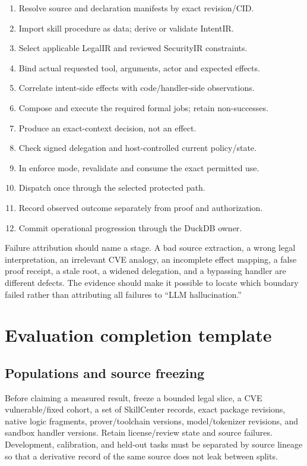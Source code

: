 \documentclass{article}
\begin{document}
\begin{enumerate}
\item Resolve source and declaration manifests by exact revision/CID.
\item Import skill procedure as data; derive or validate IntentIR.
\item Select applicable LegalIR and reviewed SecurityIR constraints.
\item Bind actual requested tool, arguments, actor and expected effects.
\item Correlate intent-side effects with code/handler-side observations.
\item Compose and execute the required formal jobs; retain non-successes.
\item Produce an exact-context decision, not an effect.
\item Check signed delegation and host-controlled current policy/state.
\item In enforce mode, revalidate and consume the exact permitted use.
\item Dispatch once through the selected protected path.
\item Record observed outcome separately from proof and authorization.
\item Commit operational progression through the DuckDB owner.
\end{enumerate}

Failure attribution should name a stage. A bad source extraction, a wrong legal interpretation, an irrelevant CVE analogy, an incomplete effect mapping, a false proof receipt, a stale root, a widened delegation, and a bypassing handler are different defects. The evidence should make it possible to locate which boundary failed rather than attributing all failures to ``LLM hallucination.''

\section{Evaluation completion template}

\subsection{Populations and source freezing}

Before claiming a measured result, freeze a bounded legal slice, a CVE vulnerable/fixed cohort, a set of SkillCenter records, exact package revisions, native logic fragments, prover/toolchain versions, model/tokenizer revisions, and sandbox handler versions. Retain license/review state and source failures. Development, calibration, and held-out tasks must be separated by source lineage so that a derivative record of the same source does not leak between splits.
\end{document}
